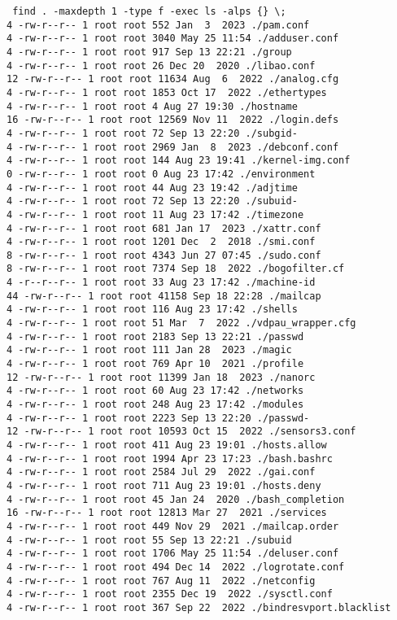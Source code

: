 \documentclass[notitlepage]{article}
\begin{document}
        \begin{verbatim}
 find . -maxdepth 1 -type f -exec ls -alps {} \;
4 -rw-r--r-- 1 root root 552 Jan  3  2023 ./pam.conf
4 -rw-r--r-- 1 root root 3040 May 25 11:54 ./adduser.conf
4 -rw-r--r-- 1 root root 917 Sep 13 22:21 ./group
4 -rw-r--r-- 1 root root 26 Dec 20  2020 ./libao.conf
12 -rw-r--r-- 1 root root 11634 Aug  6  2022 ./analog.cfg
4 -rw-r--r-- 1 root root 1853 Oct 17  2022 ./ethertypes
4 -rw-r--r-- 1 root root 4 Aug 27 19:30 ./hostname
16 -rw-r--r-- 1 root root 12569 Nov 11  2022 ./login.defs
4 -rw-r--r-- 1 root root 72 Sep 13 22:20 ./subgid-
4 -rw-r--r-- 1 root root 2969 Jan  8  2023 ./debconf.conf
4 -rw-r--r-- 1 root root 144 Aug 23 19:41 ./kernel-img.conf
0 -rw-r--r-- 1 root root 0 Aug 23 17:42 ./environment
4 -rw-r--r-- 1 root root 44 Aug 23 19:42 ./adjtime
4 -rw-r--r-- 1 root root 72 Sep 13 22:20 ./subuid-
4 -rw-r--r-- 1 root root 11 Aug 23 17:42 ./timezone
4 -rw-r--r-- 1 root root 681 Jan 17  2023 ./xattr.conf
4 -rw-r--r-- 1 root root 1201 Dec  2  2018 ./smi.conf
8 -rw-r--r-- 1 root root 4343 Jun 27 07:45 ./sudo.conf
8 -rw-r--r-- 1 root root 7374 Sep 18  2022 ./bogofilter.cf
4 -r--r--r-- 1 root root 33 Aug 23 17:42 ./machine-id
44 -rw-r--r-- 1 root root 41158 Sep 18 22:28 ./mailcap
4 -rw-r--r-- 1 root root 116 Aug 23 17:42 ./shells
4 -rw-r--r-- 1 root root 51 Mar  7  2022 ./vdpau_wrapper.cfg
4 -rw-r--r-- 1 root root 2183 Sep 13 22:21 ./passwd
4 -rw-r--r-- 1 root root 111 Jan 28  2023 ./magic
4 -rw-r--r-- 1 root root 769 Apr 10  2021 ./profile
12 -rw-r--r-- 1 root root 11399 Jan 18  2023 ./nanorc
4 -rw-r--r-- 1 root root 60 Aug 23 17:42 ./networks
4 -rw-r--r-- 1 root root 248 Aug 23 17:42 ./modules
4 -rw-r--r-- 1 root root 2223 Sep 13 22:20 ./passwd-
12 -rw-r--r-- 1 root root 10593 Oct 15  2022 ./sensors3.conf
4 -rw-r--r-- 1 root root 411 Aug 23 19:01 ./hosts.allow
4 -rw-r--r-- 1 root root 1994 Apr 23 17:23 ./bash.bashrc
4 -rw-r--r-- 1 root root 2584 Jul 29  2022 ./gai.conf
4 -rw-r--r-- 1 root root 711 Aug 23 19:01 ./hosts.deny
4 -rw-r--r-- 1 root root 45 Jan 24  2020 ./bash_completion
16 -rw-r--r-- 1 root root 12813 Mar 27  2021 ./services
4 -rw-r--r-- 1 root root 449 Nov 29  2021 ./mailcap.order
4 -rw-r--r-- 1 root root 55 Sep 13 22:21 ./subuid
4 -rw-r--r-- 1 root root 1706 May 25 11:54 ./deluser.conf
4 -rw-r--r-- 1 root root 494 Dec 14  2022 ./logrotate.conf
4 -rw-r--r-- 1 root root 767 Aug 11  2022 ./netconfig
4 -rw-r--r-- 1 root root 2355 Dec 19  2022 ./sysctl.conf
4 -rw-r--r-- 1 root root 367 Sep 22  2022 ./bindresvport.blacklist
        \end{verbatim}
\end{document}

